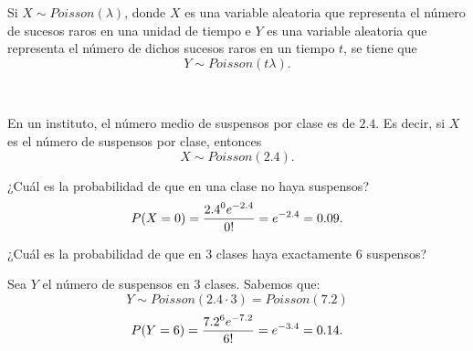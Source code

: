 \documentclass[oneside,openright,titlepage,numbers=noenddot,openany,headinclude,footinclude=true,
cleardoublepage=empty,abstractoff,BCOR=5mm,paper=a4,fontsize=12pt,main=spanish]{scrreprt}
\begin{document}
\begin{proposition}
Si $X \sim Poisson(\lambda)$, donde $X$ es una variable aleatoria que representa el número de sucesos raros en una unidad de tiempo e $Y$ es una variable aleatoria que representa el número de dichos sucesos raros en un tiempo $t$, se tiene que $$Y \sim Poisson(t\lambda).$$
\end{proposition}\

\begin{example} \label{ex:ejpoisson}
En un instituto, el número medio de suspensos por clase es de $2.4$. Es decir, si $X$ es el número de suspensos por clase, entonces $$X \sim Poisson(2.4).$$ 

¿Cuál es la probabilidad de que en una clase no haya suspensos? $$P(X=0)=\frac{\displaystyle 2.4^0 e^{-2.4}}{\displaystyle 0!}=e^{-2.4}=0.09.$$

¿Cuál es la probabilidad de que en 3 clases haya exactamente 6 suspensos?

Sea $Y$ el número de suspensos en 3 clases. Sabemos que: $$Y \sim Poisson(2.4\cdot 3)=Poisson(7.2)$$ $$P(Y=6)=\frac{\displaystyle 7.2^6 e^{-7.2}}{\displaystyle 6!}=e^{-3.4}=0.14.$$
\end{example}\
\end{document}
